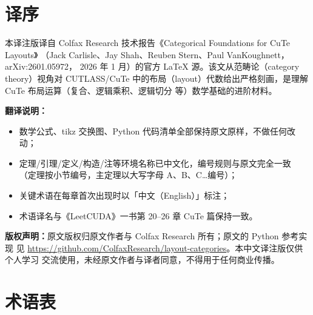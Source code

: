 \chapter*{译序}

本译注版译自 Colfax Research 技术报告《Categorical Foundations for CuTe Layouts》
（Jack Carlisle、Jay Shah、Reuben Stern、Paul VanKoughnett，arXiv:2601.05972，
2026 年 1 月）的官方 LaTeX 源。该文从范畴论（category theory）视角对 CUTLASS/CuTe
中的布局（layout）代数给出严格刻画，是理解 CuTe 布局运算（复合、逻辑乘积、逻辑切分
等）数学基础的进阶材料。

\textbf{翻译说明：}
\begin{itemize}
  \item 数学公式、tikz 交换图、Python 代码清单全部保持原文原样，不做任何改动；
  \item 定理/引理/定义/构造/注等环境名称已中文化，编号规则与原文完全一致
        （定理按小节编号，主定理以大写字母 A、B、C\ldots 编号）；
  \item 关键术语在每章首次出现时以「中文（English）」标注；
  \item 术语译名与《LeetCUDA》一书第 20--26 章 CuTe 篇保持一致。
\end{itemize}

\textbf{版权声明：}原文版权归原文作者与 Colfax Research 所有；原文的 Python 参考实现
见 \url{https://github.com/ColfaxResearch/layout-categories}。本中文译注版仅供个人学习
交流使用，未经原文作者与译者同意，不得用于任何商业传播。

\chapter*{术语表}

